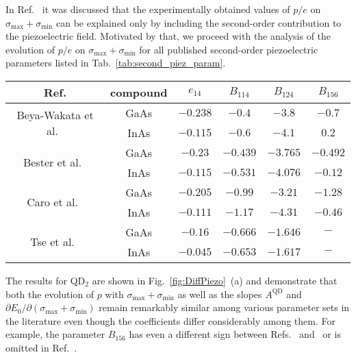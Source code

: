 In Ref.~\cite{Aberl:17} it was discussed that the experimentally obtained values of $p/e$ on $\sigma_{\mathrm{max}}+\sigma_{\mathrm{min}}$ can be explained only by including the second-order contribution to the piezoelectric field.
%
Motivated by that, we proceed with the analysis of the evolution of $p/e$ on $\sigma_{\mathrm{max}}+\sigma_{\mathrm{min}}$ for all published second-order piezoelectric parameters listed in Tab.~\ref{tab:second_piez_param}. 
%
%
\begin{table*}[!ht]
	\label{tab:second_piez_param}
	\begin{center}
		\caption{Values for the linear and quadratic piezoelectric coefficients $e_{14}$, $B_{114}$, $B_{124}$ and $B_{156}$. The references from which the parameters were taken are identified in the first column. The units of presented piezoelectric constants are $C/m^2$. For In$_x$Ga$_{1-x}$As, the constants were obtained by linear interpolation.
		}
		\begin{tabular}{c|ccccc}
			\hline \hline
			Ref. & compound & $e_{14}$ & $B_{114}$  & $B_{124}$ &$B_{156}$\\
			\hline
			\multirow{2}{*}{Beya-Wakata et al.~\cite{Beya-Wakata2011}} & GaAs & $-0.238$ & $-0.4$  & $-3.8$& $-0.7$\\
			& InAs& $-0.115$ & $-0.6$  & $-4.1$& $0.2$\\
			\hline
			\multirow{2}{*}{Bester et al.~\cite{Bester:06} }& GaAs & $-0.23$ & $-0.439$  & $-3.765$& $-0.492$\\
			& InAs& $-0.115$ & $-0.531$  & $-4.076$& $-0.12$\\
			\hline
			\multirow{2}{*}{Caro et al.~\cite{Caro2015}} & GaAs & $-0.205$ & $-0.99$  & $-3.21$& $-1.28$\\
			& InAs& $-0.111$ & $-1.17$  & $-4.31$& $-0.46$\\
			\hline
			\multirow{2}{*}{Tse et al.~\cite{Tse2013}} & GaAs & $-0.16$ & $-0.666$  & $-1.646$& $-$\\
			& InAs& $-0.045$ & $-0.653$  & $-1.617$& $-$\\
			\hline \hline
		\end{tabular}
	\end{center}
\end{table*}
%
%
The results for QD$_2$ are shown in Fig.~\ref{fig:DiffPiezo}~(a) and demonstrate that both the evolution of $p$ with $\sigma_{\mathrm{max}}+\sigma_{\mathrm{min}}$ as well as the slopes $A^{\mathrm{QD}}$ and $\partial E_0/\partial(\sigma_{\mathrm{max}}+\sigma_{\mathrm{min}})$ remain remarkably similar among various parameter sets in the literature even though the coefficients differ considerably among them.
For example, the parameter $B_{156}$ has even a different sign between Refs.~\cite{Bester:06} and~\cite{Beya-Wakata2011} or is omitted in Ref.~\cite{Tse2013}.
%


